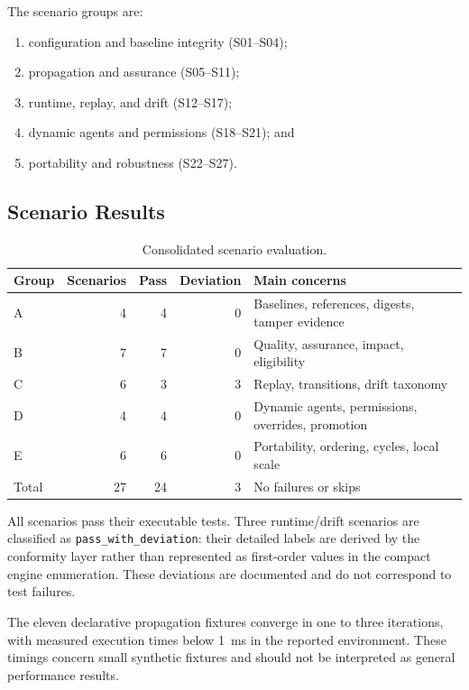 \documentclass[10pt]{article}
\begin{document}
The scenario groups are:

\begin{enumerate}[leftmargin=*]
  \item configuration and baseline integrity (S01--S04);
  \item propagation and assurance (S05--S11);
  \item runtime, replay, and drift (S12--S17);
  \item dynamic agents and permissions (S18--S21); and
  \item portability and robustness (S22--S27).
\end{enumerate}

\subsection{Scenario Results}

\begin{table}[t]
\centering
\caption{Consolidated scenario evaluation.}
\label{tab:scenario-results}
\begin{tabularx}{\linewidth}{lrrrX}
\toprule
Group & Scenarios & Pass & Deviation & Main concerns \\
\midrule
A & 4 & 4 & 0 & Baselines, references, digests, tamper evidence \\
B & 7 & 7 & 0 & Quality, assurance, impact, eligibility \\
C & 6 & 3 & 3 & Replay, transitions, drift taxonomy \\
D & 4 & 4 & 0 & Dynamic agents, permissions, overrides, promotion \\
E & 6 & 6 & 0 & Portability, ordering, cycles, local scale \\
\midrule
Total & 27 & 24 & 3 & No failures or skips \\
\bottomrule
\end{tabularx}
\end{table}

All scenarios pass their executable tests. Three runtime/drift scenarios are classified as \texttt{pass\_with\_deviation}: their detailed labels are derived by the conformity layer rather than represented as first-order values in the compact engine enumeration. These deviations are documented and do not correspond to test failures.

The eleven declarative propagation fixtures converge in one to three iterations, with measured execution times below 1~ms in the reported environment. These timings concern small synthetic fixtures and should not be interpreted as general performance results.
\end{document}
